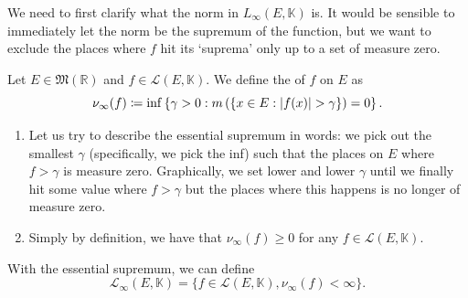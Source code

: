 \documentclass[notoc,notitlepage]{tufte-book}
\begin{document}
We need to first clarify what the norm in $L_\infty(E, \mathbb{K})$ is. It would
be sensible to immediately let the norm be the supremum of the function, but we
want to exclude the places where $f$ hit its `suprema' only up to a set of
measure zero.

\begin{defn}\label{defn:essential_supremum}
  Let $E \in \mathfrak{M}(\mathbb{R})$ and $f \in \mathcal{L}(E, \mathbb{K})$.
  We define the  of $f$ on $E$ as
  \begin{equation*}
    \nu_\infty(f) \coloneqq \inf \left\{ \gamma > 0 : m \left( \{ x \in E :
    \left|f(x)\right| > \gamma \} \right) = 0 \right\}.
  \end{equation*}
\end{defn}

\begin{note}
  \begin{enumerate}
    \item Let us try to describe the essential supremum in words: we pick out
      the smallest $\gamma$ (specifically, we pick the inf) such that the places
      on $E$ where $f > \gamma$ is measure zero. Graphically, we set lower and
      lower $\gamma$ until we finally hit some value where $f > \gamma$ but the
      places where this happens is no longer of measure zero.
    \item Simply by definition, we have that $\nu_\infty(f) \geq 0$ for any $f
      \in \mathcal{L}(E, \mathbb{K})$.
  \end{enumerate}
\end{note}

\begin{defn}\label{defn:_l_infty_e_k_}
  With the essential supremum, we can define
  \begin{equation*}
    \mathcal{L}_\infty(E, \mathbb{K}) = \{ f \in \mathcal{L}(E, \mathbb{K}),
    \nu_\infty(f) < \infty \}.
  \end{equation*}
\end{defn}
\end{document}
